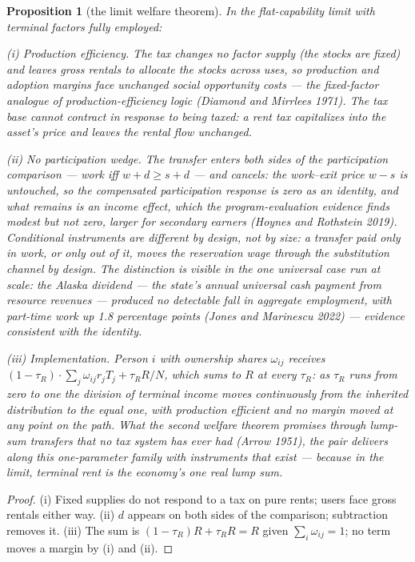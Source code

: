 \documentclass[12pt]{article}
\theoremstyle{plain}
\newtheorem{proposition}{Proposition}
\begin{document}
\begin{proposition}[the limit welfare theorem]\label{prop:welfare}
In the flat-capability limit with terminal factors fully employed:

(i) \emph{Production efficiency.} The tax changes no factor supply (the stocks are fixed) and leaves gross rentals to allocate the stocks across uses, so production and adoption margins face unchanged social opportunity costs --- the fixed-factor analogue of production-efficiency logic (Diamond and Mirrlees 1971). The tax base cannot contract in response to being taxed: a rent tax capitalizes into the asset's price and leaves the rental flow unchanged.

(ii) \emph{No participation wedge.} The transfer enters both sides of the participation comparison --- work iff $w + d \ge s + d$ --- and cancels: the work--exit price $w - s$ is untouched, so the compensated participation response is zero as an identity, and what remains is an income effect, which the program-evaluation evidence finds modest but not zero, larger for secondary earners (Hoynes and Rothstein 2019). Conditional instruments are different by design, not by size: a transfer paid only in work, or only out of it, moves the reservation wage through the substitution channel by design. The distinction is visible in the one universal case run at scale: the Alaska dividend --- the state's annual universal cash payment from resource revenues --- produced no detectable fall in aggregate employment, with part-time work up 1.8 percentage points (Jones and Marinescu 2022) --- evidence consistent with the identity.

(iii) \emph{Implementation.} Person $i$ with ownership shares $\omega _{ij}$ receives $(1-\tau _R)\cdot \sum _j\omega _{ij}r_j T_j + \tau _R R/N$, which sums to $R$ at every $\tau _R$: as $\tau _R$ runs from zero to one the division of terminal income moves continuously from the inherited distribution to the equal one, with production efficient and no margin moved at any point on the path. What the second welfare theorem promises through lump-sum transfers that no tax system has ever had (Arrow 1951), the pair delivers along this one-parameter family with instruments that exist --- because in the limit, terminal rent is the economy's one real lump sum.
\end{proposition}

\begin{proof}
(i) Fixed supplies do not respond to a tax on pure rents; users face gross rentals either way. (ii) $d$ appears on both sides of the comparison; subtraction removes it. (iii) The sum is $(1-\tau _R)R + \tau _R R = R$ given $\sum _i\omega _{ij} = 1$; no term moves a margin by (i) and (ii).
\end{proof}
\end{document}
